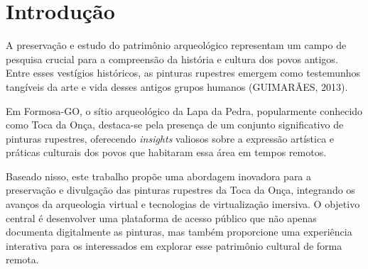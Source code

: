 \chapter{Introdução}\label{Introducao}

A preservação e estudo do patrimônio arqueológico representam um campo de pesquisa crucial para a compreensão da história e cultura dos povos antigos. Entre esses vestígios históricos, as pinturas rupestres emergem como testemunhos tangíveis da arte e vida desses antigos grupos humanos (GUIMARÃES, 2013).



Em Formosa-GO, o sítio arqueológico da Lapa da Pedra, popularmente conhecido como Toca da Onça, destaca-se pela presença de um conjunto significativo de pinturas rupestres, oferecendo \textit{insights} valiosos sobre a expressão artística e práticas culturais dos povos que habitaram essa área em tempos remotos.
    
Baseado nisso, este trabalho propõe uma abordagem inovadora para a preservação e divulgação das pinturas rupestres da Toca da Onça, integrando os avanços da arqueologia virtual e tecnologias de virtualização imersiva. O objetivo central é desenvolver uma plataforma de acesso público que não apenas documenta digitalmente as pinturas, mas também proporcione uma experiência interativa para os interessados em explorar esse patrimônio cultural de forma remota.

